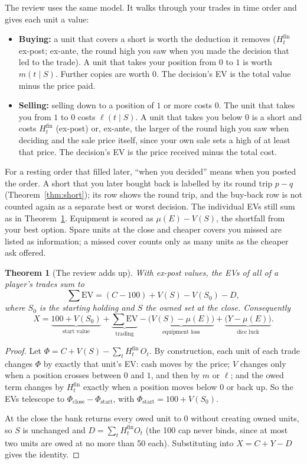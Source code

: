 \documentclass[11pt]{article}
\newtheorem{theorem}{Theorem}
\theoremstyle{definition}
\newcommand{\Hf}{H^{\mathrm{fin}}}
\begin{document}
The review uses the same model. It walks through your trades in time order and gives each unit a value:
\begin{itemize}
\item \textbf{Buying:} a unit that covers a short is worth the deduction it removes ($\Hf_t$ ex-post; ex-ante, the round high you saw when you made the decision that led to the trade). A unit that takes your position from $0$ to $1$ is worth $m(t\mid S)$. Further copies are worth $0$. The decision's EV is the total value minus the price paid.
\item \textbf{Selling:} selling down to a position of $1$ or more costs $0$. The unit that takes you from $1$ to $0$ costs $\ell(t\mid S)$. A unit that takes you below $0$ is a short and costs $\Hf_t$ (ex-post) or, ex-ante, the larger of the round high you saw when deciding and the sale price itself, since your own sale sets a high of at least that price. The decision's EV is the price received minus the total cost.
\end{itemize}
For a resting order that filled later, ``when you decided'' means when you posted the order. A short that you later bought back is labelled by its round trip $p - q$ (Theorem~\ref{thm:short}); its row shows the round trip, and the buy-back row is not counted again as a separate best or worst decision. The individual EVs still sum as in Theorem~\ref{thm:telescope}. Equipment is scored as $\mu(E) - V(S)$, the shortfall from your best option. Spare units at the close and cheaper covers you missed are listed as information; a missed cover counts only as many units as the cheaper ask offered.

\begin{theorem}[The review adds up]\label{thm:telescope}
With ex-post values, the EVs of all of a player's trades sum to
\[
  \textstyle\sum \mathrm{EV} = (C - 100) + V(S) - V(S_0) - D ,
\]
where $S_0$ is the starting holding and $S$ the owned set at the close. Consequently
\[
  X = \underbrace{100 + V(S_0)}_{\text{start value}} + \underbrace{\textstyle\sum \mathrm{EV}}_{\text{trading}} - \underbrace{\bigl(V(S) - \mu(E)\bigr)}_{\text{equipment loss}} + \underbrace{\bigl(Y - \mu(E)\bigr)}_{\text{dice luck}} .
\]
\end{theorem}
\begin{proof}
Let $\Phi = C + V(S) - \sum_t \Hf_t\,O_t$. By construction, each unit of each trade changes $\Phi$ by exactly that unit's EV: cash moves by the price; $V$ changes only when a position crosses between $0$ and $1$, and then by $m$ or $\ell$; and the owed term changes by $\Hf_t$ exactly when a position moves below $0$ or back up. So the EVs telescope to $\Phi_{\text{close}} - \Phi_{\text{start}}$, with $\Phi_{\text{start}} = 100 + V(S_0)$.

At the close the bank returns every owed unit to $0$ without creating owned units, so $S$ is unchanged and $D = \sum_t \Hf_t O_t$ (the 100 cap never binds, since at most two units are owed at no more than 50 each). Substituting into $X = C + Y - D$ gives the identity.
\end{proof}
\end{document}
